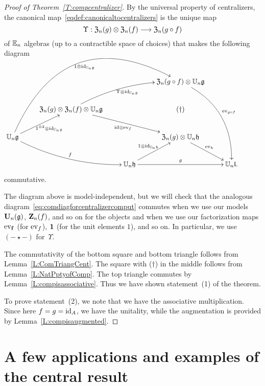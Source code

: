 \documentclass[11pt]{amsart}
\numberwithin{equation}{section}
\begin{document}
\begin{proof}[Proof of Theorem~\ref{T:compcentralizer}]
By the universal property of centralizers, 
the canonical map~\eqref{eqdef:canonicaltocentralizers} is the unique map 
\[ 
\Upsilon: {\frak Z}_n(g) \otimes {\frak Z}_n(f) \longrightarrow {\frak Z}_n(g\circ f)
\] 
of $\mathbb E_n$ algebras (up to a contractible space of choices) that makes the following diagram
\begin{equation}
\label{eq:comdiagforcentralizercomput}
\xymatrix{
&   &&  
{\frak Z}_n(g\circ f) \otimes  \UU_n \fg  \ar@/^{2pc}/[dddr]^{\ev_{g\circ f}}\\
&{\frak Z}_n(g) \otimes  {\frak Z}_n(f) \otimes \UU_n \fg \ar@/^{1pc}/[rru]_{ \Upsilon \otimes \id_{\UU_n \fg}} \ar[rrd]_{\id\otimes \ev_{f}}
&& (\dagger)
& & \\
\UU_n \fg \ar[ur]_{1^{\otimes 2}\otimes \id_{\UU_n \fg}} \ar@/_{1pc}/[rrd]^{f} \ar@/^{6pc}/[rrruu]_{1\otimes \id_{\UU_n \fg}} &&&
{\frak Z}_n(g) \otimes \UU_n \fh \ar[rd]^{\ev_{h}}  &\\
&& \UU_n \fh \ar[rr]^{g} \ar[ur]^{1\otimes \id_{\UU_n \fh}} && \UU_n \fl .
}
\end{equation}
commutative.

The diagram above is model-independent,
but we will check that the analogous diagram~\eqref{eq:comdiagforcentralizercomput} commutes when we use our models $\mathbf U_n (\mathfrak g)$, $\mathbf Z_n(f)$, and so on for the objects and when we use our factorization maps ${\rm ev}_{{\bf f}}$ (for ${\rm ev}_f$), ${\bf 1}$ (for the unit elements $1$),  and so on.
In particular, we use $(-\star-)$ for~$\Upsilon$.

The commutativity of the bottom square and bottom triangle follows from Lemma~\ref{L:ComTriangCent}.
The square with ($\dagger$) in the middle follows from Lemma~\ref{L:NatPptyofComp}.
The top triangle commutes by Lemma~\ref{L:compisassociative}. 
Thus we have shown statement~(1) of the theorem.

To prove statement~(2), we note that we have the associative multiplication.
Since here $f=g={\rm id}_A$, we have the unitality,
while the augmentation is provided by Lemma~\ref{L:compisaugmented}.
\end{proof}

\section{A few applications and examples of the central result}
\end{document}

